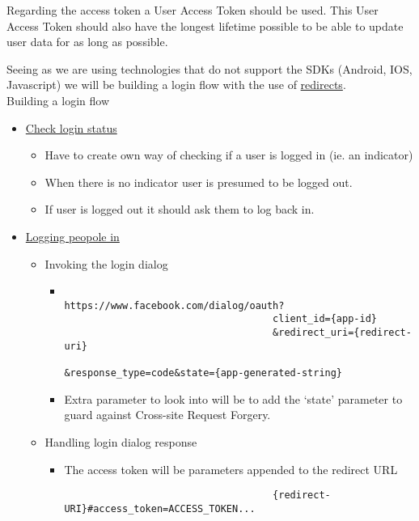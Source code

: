 \documentclass{article}
\begin{document}
			Regarding the access token a User Access Token should be used. This User Access Token should also have the longest lifetime possible to be able to update user data for as long as possible.

			Seeing as we are using technologies that do not support the SDKs (Android, IOS, Javascript) we will be building a login flow with the use of \href{https://developers.facebook.com/docs/facebook-login/manually-build-a-login-flow}{redirects}.\\

			Building a login flow
			\begin{itemize}
				\item \href{https://developers.facebook.com/docs/facebook-login/manually-build-a-login-flow#checklogin}{Check login status}
					\begin{itemize}
						\item Have to create own way of checking if a user is logged in (ie. an indicator)
						\item When there is no indicator user is presumed to be logged out.
						\item If user is logged out it should ask them to log back in.
					\end{itemize}
				\item \href{https://developers.facebook.com/docs/facebook-login/manually-build-a-login-flow#login}{Logging peopole in}
					\begin{itemize}
						\item Invoking the login dialog
							\begin{itemize}
								\item
									\begin{verbatim}
									https://www.facebook.com/dialog/oauth?
									client_id={app-id}
									&redirect_uri={redirect-uri}
									&response_type=code&state={app-generated-string}
									\end{verbatim}
								\item Extra parameter to look into will be to add the `state' parameter to guard against Cross-site Request Forgery.
							\end{itemize}
						\item Handling login dialog response
							\begin{itemize}
								\item The access token will be parameters appended to the redirect URL
								\begin{verbatim}
									{redirect-URI}#access_token=ACCESS_TOKEN...

\end{verbatim}
\end{itemize}
\end{itemize}
\end{itemize}
\end{document}
